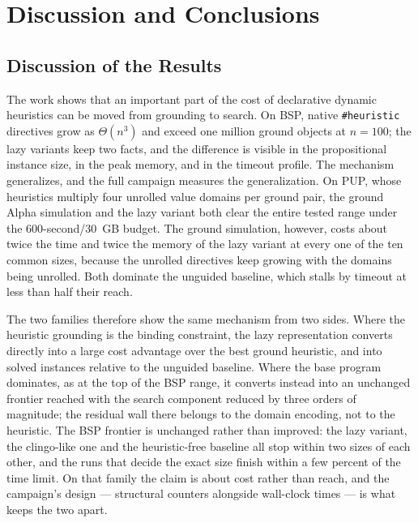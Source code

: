\chapter{Discussion and Conclusions}
\label{sec:discussion}

\section{Discussion of the Results}

The work shows that an important part of the cost of declarative dynamic heuristics can be moved from grounding to search. On BSP, native \texttt{\#heuristic} directives grow as $\Theta(n^3)$ and exceed one million ground objects at $n=100$; the lazy variants keep two facts, and the difference is visible in the propositional instance size, in the peak memory, and in the timeout profile. The mechanism generalizes, and the full campaign measures the generalization. On PUP, whose heuristics multiply four unrolled value domains per ground pair, the ground Alpha simulation and the lazy variant both clear the entire tested range under the 600-second/30~GB budget. The ground simulation, however, costs about twice the time and twice the memory of the lazy variant at every one of the ten common sizes, because the unrolled directives keep growing with the domains being unrolled. Both dominate the unguided baseline, which stalls by timeout at less than half their reach.

The two families therefore show the same mechanism from two sides. Where the heuristic grounding is the binding constraint, the lazy representation converts directly into a large cost advantage over the best ground heuristic, and into solved instances relative to the unguided baseline. Where the base program dominates, as at the top of the BSP range, it converts instead into an unchanged frontier reached with the search component reduced by three orders of magnitude; the residual wall there belongs to the domain encoding, not to the heuristic. The BSP frontier is unchanged rather than improved: the lazy variant, the clingo-like one and the heuristic-free baseline all stop within two sizes of each other, and the runs that decide the exact size finish within a few percent of the time limit. On that family the claim is about cost rather than reach, and the campaign's design --- structural counters alongside wall-clock times --- is what keeps the two apart.

